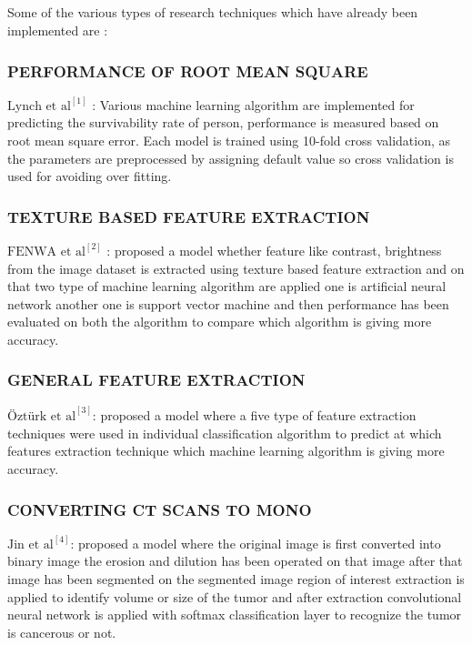 \documentclass[12pt]{article}
\newcommand{\msize}{\fontsize{14pt}{12pt}\selectfont}
\begin{document}
\subsection{\msize{\textbf{\textbf{METHODS USED IN RESEARCH PAPERS}}}}
Some of the various types of research techniques which have already been implemented are : 
\subsubsection{\textbf{PERFORMANCE OF ROOT MEAN SQUARE }}
$\text{Lynch et al}^{[1]}$ :  Various machine learning algorithm are implemented for predicting the survivability rate of person, performance is measured based on root mean square error. Each model is trained using 10-fold cross validation, as the parameters are preprocessed by assigning default value so cross validation is used for avoiding over fitting.

\subsubsection{\textbf{TEXTURE BASED FEATURE EXTRACTION}} 
$\text{FENWA et al}^{[2]}$ :  proposed a model whether feature like contrast, brightness from the image dataset is extracted using texture based feature extraction and on that two type of machine learning algorithm are applied one is artificial neural network another one is support vector machine and then performance has been evaluated on both the algorithm to compare which algorithm is giving more accuracy.

\subsubsection{\textbf{GENERAL FEATURE EXTRACTION}} 
$\text{Öztürk et al}^{ [3]}$: proposed a model where a five type of feature extraction techniques were used in individual classification algorithm to predict at which features extraction technique which machine learning algorithm is giving more accuracy.

\subsubsection{\textbf{CONVERTING CT SCANS TO MONO}}
$\text{Jin et al}^{ [4]}$:  proposed a model where the original image is first converted into binary image the erosion and dilution has been operated on that image after that image has been segmented on the segmented image region of interest extraction is applied to identify volume or size of the tumor and after extraction convolutional neural network is applied with softmax classification layer to recognize the tumor is cancerous or not.
\end{document}
